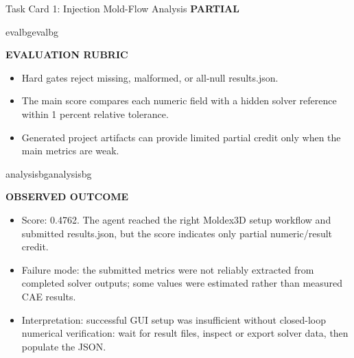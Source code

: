 \documentclass{llmxive}
\providecommand{\StatusBadge}[3]{\begingroup\setlength{\fboxsep}{3pt}\colorbox{#2}{\textbf{#1}}\endgroup}
\providecommand{\BlockTitle}[1]{{\raggedright\textbf{\footnotesize #1}\par}\vspace{2pt}}
\begin{document}
\begin{ColorTaskCard}{Task Card 1: Injection Mold-Flow Analysis \hfill \StatusBadge{PARTIAL}{partialbg}{partialorange}}
\begin{minipage}[t]{0.49\linewidth}
\end{minipage}\hfill
\begin{minipage}[t]{0.49\linewidth}
\vspace{0pt}
\begin{CardBlock}{evalbg}{evalbg}
\BlockTitle{EVALUATION RUBRIC}
\begin{itemize}
\item Hard gates reject missing, malformed, or all-null results.json.
\item The main score compares each numeric field with a hidden solver reference within 1 percent relative tolerance.
\item Generated project artifacts can provide limited partial credit only when the main metrics are weak.
\end{itemize}
\end{CardBlock}

\begin{CardBlock}{analysisbg}{analysisbg}
\BlockTitle{OBSERVED OUTCOME}
\begin{itemize}
\item Score: 0.4762. The agent reached the right Moldex3D setup workflow and submitted results.json, but the score indicates only partial numeric/result credit.
\item Failure mode: the submitted metrics were not reliably extracted from completed solver outputs; some values were estimated rather than measured CAE results.
\item Interpretation: successful GUI setup was insufficient without closed-loop numerical verification: wait for result files, inspect or export solver data, then populate the JSON.
\end{itemize}
\end{CardBlock}
\end{minipage}
\end{ColorTaskCard}
\end{document}
